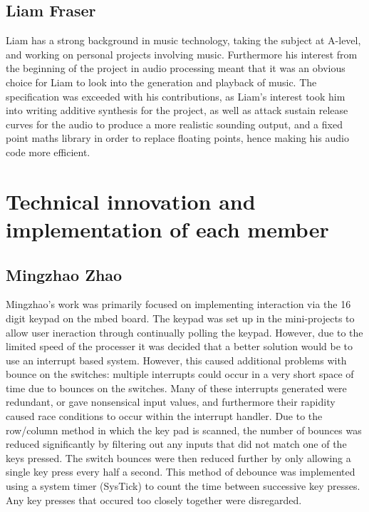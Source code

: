 \subsection*{Liam Fraser}
Liam has a strong background in music technology, taking the subject at A-level,
and working on personal projects involving music. Furthermore his interest from 
the beginning of the project in audio processing meant that it was an obvious 
choice for Liam to look into the generation and playback of music. The 
specification was exceeded with his contributions, as Liam's interest took him 
into writing additive synthesis for the project, as well as attack sustain release 
curves for the audio to produce a more realistic sounding output, and a fixed 
point maths library in order to replace floating points, hence making his audio 
code more efficient. 

\section{Technical innovation and implementation of each member}
\subsection*{Mingzhao Zhao}
Mingzhao's work was primarily focused on implementing interaction via 
the 16 digit keypad on the mbed board. The keypad was set up in the mini-projects 
to allow user ineraction through continually polling the keypad. However, due 
to the limited speed of the processer it was decided that a better solution 
would be to use an interrupt based system.
However, this caused additional problems with bounce on the switches: 
multiple interrupts could occur in a very short space of time due to bounces on 
the switches. Many of these interrupts generated were redundant, or gave 
nonsensical input values, and furthermore their rapidity caused race conditions 
to occur within the interrupt handler. 
Due to the row/column method in which the key pad is scanned, the 
number of bounces was reduced significantly by filtering out any inputs that 
did not match one of the keys pressed. The switch bounces were then reduced 
further by only allowing a single key press every half a second. 
This method of debounce was implemented using a system 
timer (SysTick) to count the time between successive key presses. Any key 
presses that occured too closely together were disregarded. 

